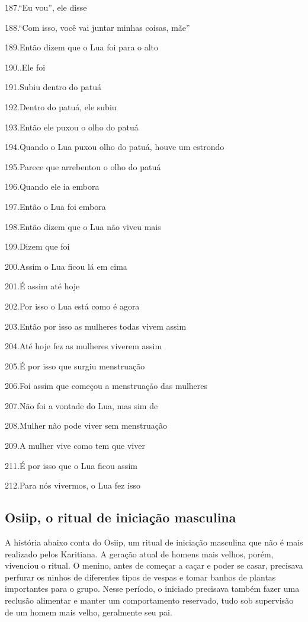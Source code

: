 187.``Eu vou'', ele disse

188.``Com isso, você vai juntar minhas coisas, mãe''

189.Então dizem que o Lua foi para o alto

190..Ele foi

191.Subiu dentro do patuá

192.Dentro do patuá, ele subiu

193.Então ele puxou o olho do patuá

194.Quando o Lua puxou olho do patuá, houve um estrondo

195.Parece que arrebentou o olho do patuá

196.Quando ele ia embora

197.Então o Lua foi embora

198.Então dizem que o Lua não viveu mais

199.Dizem que foi

200.Assim o Lua ficou lá em cima

201.É assim até hoje

202.Por isso o Lua está como é agora

203.Então por isso as mulheres todas vivem assim

204.Até hoje fez as mulheres viverem assim

205.É por isso que surgiu menstruação

206.Foi assim que começou a menstruação das mulheres

207.Não foi a vontade do Lua, mas sim de

208.Mulher não pode viver sem menstruação

209.A mulher vive como tem que viver

211.É por isso que o Lua ficou assim

212.Para nós vivermos, o Lua fez isso

\subsection{Osiip, o ritual de iniciação
masculina}\label{osiip-o-ritual-de-iniciauxe7uxe3o-masculina}

A história abaixo conta do Osiip, um ritual de iniciação masculina que
não é mais realizado pelos Karitiana. A geração atual de homens mais
velhos, porém, vivenciou o ritual. O menino, antes de começar a caçar e
poder se casar, precisava perfurar os ninhos de diferentes tipos de
vespas e tomar banhos de plantas importantes para o grupo. Nesse
período, o iniciado precisava também fazer uma reclusão alimentar e
manter um comportamento reservado, tudo sob supervisão de um homem mais
velho, geralmente seu pai.

